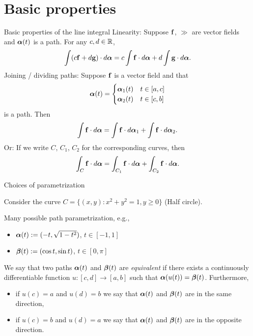 \section{Basic properties}



 {Basic properties of the line integral}
 {Linearity:}
Suppose \(\mathbf{f}\), \(\gg\) are vector fields and \(\boldsymbol{\alpha}(t)\) is a path. For any \(c,d\in \mathbb{R}\),
\[
    \int (c\mathbf{f} + d\mathbf{g}) \cdot d\boldsymbol{\alpha} =  c \int \mathbf{f}  \cdot d\boldsymbol{\alpha} +  d \int \mathbf{g} \cdot d\boldsymbol{\alpha}.
\]
{Joining / dividing paths:}
Suppose \(\mathbf{f}\) is a vector field and that
\[
    \boldsymbol{\alpha}(t) = \begin{cases}
        \boldsymbol{\alpha}_1(t) & t\in [a,c] \\
        \boldsymbol{\alpha}_2(t) & t\in [c,b]
    \end{cases}
\]
is a path.
Then
\[
    \int \mathbf{f}  \cdot d\boldsymbol{\alpha} = \int \mathbf{f}  \cdot d\boldsymbol{\alpha}_1  + \int \mathbf{f}  \cdot d\boldsymbol{\alpha}_2.
\]
{Or:}
If we write \(C\), \(C_1\), \(C_2\) for the corresponding curves, then
\[
    \int_{C} \mathbf{f}  \cdot d\boldsymbol{\alpha} = \int_{C_1} \mathbf{f}  \cdot d\boldsymbol{\alpha} + \int_{C_2} \mathbf{f}  \cdot d\boldsymbol{\alpha}.
\]







{Choices of parametrization}

Consider the curve \(C = \{(x,y) : x^2 + y^2 = 1, y\geq 0\}\) (Half circle).

Many possible path parametrization, e.g.,

\begin{itemize}
    \item     \(\boldsymbol{\alpha}(t):= ( -t , \sqrt{1-t^2})\), \(t\in [-1,1]\)
    \item  \(\boldsymbol{\beta}(t) := (\cos t, \sin t)\), \(t\in [0,\pi]\)
\end{itemize}


\begin{definition}
    We say that two paths \(\boldsymbol{\alpha}(t)\) and \(\boldsymbol{\beta}(t)\) are \emph{equivalent} if there exists a continuously differentiable function \(u : [c,d] \to [a,b] \) such that \(\boldsymbol{\alpha}(u(t)) = \boldsymbol{\beta}(t)\).
    Furthermore,
    \begin{itemize}
        \item if \(u(c)=a\) and \(u(d)=b\) we say that  \(\boldsymbol{\alpha}(t)\) and \(\boldsymbol{\beta}(t)\) are in the same direction,
        \item if \(u(c)=b\) and \(u(d)=a\) we say that  \(\boldsymbol{\alpha}(t)\) and \(\boldsymbol{\beta}(t)\) are in the opposite direction.
    \end{itemize}
\end{definition}






